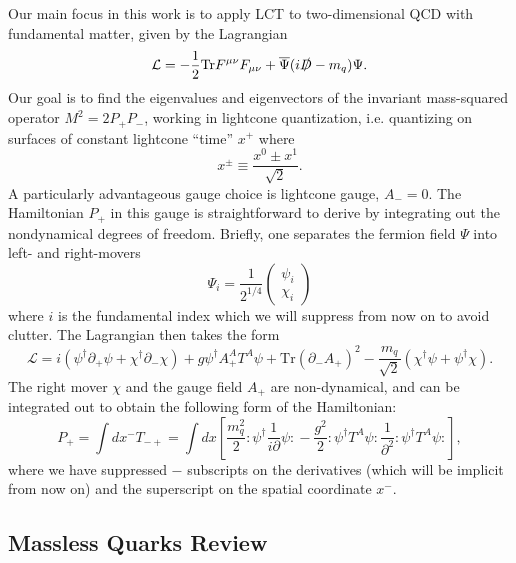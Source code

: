 \documentclass[12pt]{article}
\newcommand{\dagg}{\dagger}
\newcommand{\Tr}{\textrm{Tr}}
\newcommand{\ptl}{\partial}
\begin{document}
 Our main focus in this work is to apply LCT to two-dimensional QCD with fundamental matter, given by the Lagrangian \begin{equation}
	\mathcal{L} = -\frac{1}{2} \textrm{Tr} F^{\mu\nu} F_{\mu\nu} + \overline{\Psi}(i \slashed{D} - m_q) \Psi.
\end{equation} Our goal is to find the eigenvalues and eigenvectors of the invariant mass-squared operator $M^2 = 2P_+ P_-$, working in lightcone quantization,  i.e. quantizing on surfaces of constant lightcone ``time'' $x^+$ where \begin{equation}
	x^{\pm} \equiv \frac{x^0 \pm x^1}{\sqrt{2}}.
\end{equation} 
A particularly advantageous gauge choice is lightcone gauge, $A_-=0$.  The Hamiltonian $P_+$  in this gauge is straightforward to derive by integrating out the nondynamical degrees of freedom. Briefly, one separates the fermion field $\Psi$ into left- and right-movers
 \begin{equation}
	\Psi_i = \frac{1}{2^{1/4}}\begin{pmatrix}
	\psi_i \\ \chi_i
\end{pmatrix}
\end{equation} where $i$ is the fundamental index which we will suppress from now on to avoid clutter. The Lagrangian then takes the form \begin{equation}
	\mathcal{L} = i(\psi^\dagg \ptl_+ \psi + \chi^\dagg \ptl_- \chi) + g \psi^\dagg A_+^A T^A \psi + \Tr(\ptl_- A_+)^2 -\frac{m_q}{\sqrt{2}}(\chi^\dagg \psi + \psi^\dagg \chi).
\end{equation} 
The right mover $\chi$ and the gauge field $A_+$ are non-dynamical, and can be integrated out to obtain the following form of the Hamiltonian: \begin{equation}
	P_+ = \int dx^- T_{-+} =  \int dx \left[\frac{m_q^2}{2} \mathrm{:} \psi^\dagg \frac{1}{i\ptl}\psi \mathrm{:} - \frac{g^2}{2} \mathrm{:}\psi^\dagg T^A \psi \mathrm{:} \frac{1}{\ptl^2} \mathrm{:} \psi^\dagg T^A \psi \mathrm{:} \right], \label{eqn:2dqcdhamiltonian}
\end{equation} where we have suppressed $-$ subscripts on the derivatives (which will be  implicit from now on) and the superscript on the spatial coordinate $x^-$.



\subsection{Massless Quarks Review}
\end{document}

